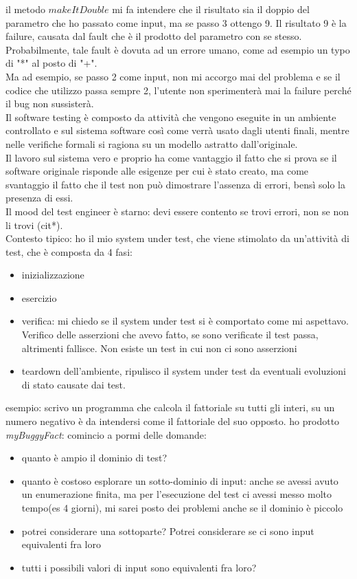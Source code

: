 \documentclass{article}
\begin{document}
il metodo $makeItDouble$ mi fa intendere che il risultato sia il doppio del parametro che ho passato come input, ma se passo 3 ottengo 9. Il risultato 9 è la failure, causata dal fault che è il prodotto del parametro con se stesso. Probabilmente, tale fault è dovuta ad un errore umano, come ad esempio un typo di "*" al posto di "+".\\ Ma ad esempio, se passo 2 come input, non mi accorgo mai del problema e se il codice che utilizzo passa sempre 2, l'utente non sperimenterà mai la failure perché il bug non sussisterà.\\ Il software testing è composto da attività che vengono eseguite in un ambiente controllato e sul sistema software così come verrà usato dagli utenti finali, mentre nelle verifiche formali si ragiona su un modello astratto dall'originale.\\ Il lavoro sul sistema vero e proprio ha come vantaggio il fatto che si prova se il software originale risponde alle esigenze per cui è stato creato, ma come svantaggio il fatto che il test non può dimostrare l'assenza di errori, bensì solo la presenza di essi.\\ Il mood del test engineer è starno: devi essere contento se trovi errori, non se non li trovi (cit*).\\ Contesto tipico: ho il mio system under test, che viene stimolato da un'attività di test, che è composta da 4 fasi:
\begin{itemize}
\item inizializzazione
\item esercizio
\item verifica: mi chiedo se il system under test si è comportato come mi aspettavo. Verifico delle asserzioni che avevo fatto, se sono verificate il test passa, altrimenti fallisce. Non esiste un test in cui non ci sono asserzioni 
\item teardown dell'ambiente, ripulisco il system under test da eventuali evoluzioni di stato causate dai test.
\end{itemize}
esempio: scrivo un programma che calcola il fattoriale su tutti gli interi, su un numero negativo è da intendersi come il fattoriale del suo opposto. ho prodotto \textit{myBuggyFact}: comincio a pormi delle domande:
\begin{itemize}
\item quanto è ampio il dominio di test?
\item quanto è costoso esplorare un sotto-dominio di input: anche se avessi avuto un enumerazione finita, ma per l'esecuzione del test ci avessi messo molto tempo(es 4 giorni), mi sarei posto dei problemi anche se il dominio è piccolo
\item potrei considerare una sottoparte? Potrei considerare se ci sono input equivalenti fra loro
\item tutti i possibili valori di input sono equivalenti fra loro?
\end{itemize}
\end{document}
